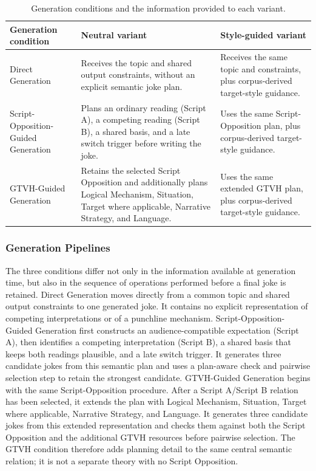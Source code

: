 \documentclass[11pt]{article}
\begin{document}
\begin{table}[t]
\centering
\caption{Generation conditions and the information provided to each variant.}\label{tab:generation-conditions}
\scriptsize\begin{tabularx}{\textwidth}{YYY}
\toprule\noalign{}
Generation condition & Neutral variant & Style-guided variant \\
\midrule\noalign{}

Direct Generation & Receives the topic and shared output constraints, without an explicit semantic joke plan. & Receives the same topic and constraints, plus corpus-derived target-style guidance. \\
Script-Opposition-Guided Generation & Plans an ordinary reading (Script A), a competing reading (Script B), a shared basis, and a late switch trigger before writing the joke. & Uses the same Script-Opposition plan, plus corpus-derived target-style guidance. \\
GTVH-Guided Generation & Retains the selected Script Opposition and additionally plans Logical Mechanism, Situation, Target where applicable, Narrative Strategy, and Language. & Uses the same extended GTVH plan, plus corpus-derived target-style guidance. \\
\bottomrule
\end{tabularx}\end{table}

\subsubsection{Generation Pipelines}\label{generation-pipelines}

The three conditions differ not only in the information available at generation time, but also in the sequence of operations performed before a final joke is retained. Direct Generation moves directly from a common topic and shared output constraints to one generated joke. It contains no explicit representation of competing interpretations or of a punchline mechanism. Script-Opposition-Guided Generation first constructs an audience-compatible expectation (Script A), then identifies a competing interpretation (Script B), a shared basis that keeps both readings plausible, and a late switch trigger. It generates three candidate jokes from this semantic plan and uses a plan-aware check and pairwise selection step to retain the strongest candidate. GTVH-Guided Generation begins with the same Script-Opposition procedure. After a Script A/Script B relation has been selected, it extends the plan with Logical Mechanism, Situation, Target where applicable, Narrative Strategy, and Language. It generates three candidate jokes from this extended representation and checks them against both the Script Opposition and the additional GTVH resources before pairwise selection. The GTVH condition therefore adds planning detail to the same central semantic relation; it is not a separate theory with no Script Opposition.
\end{document}

